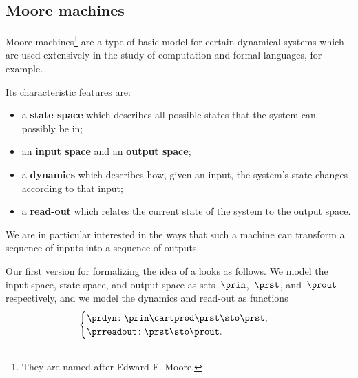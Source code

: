 
\subsection{Moore machines}

Moore machines\footnote{They are named after Edward F.
    Moore.
} are a type of basic model for certain dynamical systems which are used extensively in the study of computation and formal languages, for example. 

Its characteristic features are:
\begin{itemize}
    \item a \textbf{state space} which describes all possible states that the system can possibly be in;
    \item an \textbf{input space} and an \textbf{output space};
    \item a \textbf{dynamics} which describes how, given an input, the system's state changes according to that input;
    \item a \textbf{read-out} which relates the current state of the system to the output space.
\end{itemize}
%
We are in particular interested in the ways that such a machine can transform a sequence of inputs into a sequence of outputs.

Our first version for formalizing the idea of a  looks as follows.
We model the input space, state space, and output space as sets~$\prin$,~$\prst$, and~$\prout$ respectively, and we model the dynamics and read-out as functions
\begin{equation}
    \label{eq:moore-1}
    \begin{cases}
        \prdyn \colon \prin \cartprod \prst \sto \prst, \\
        \prreadout \colon \prst \sto \prout.
    \end{cases}
\end{equation}


